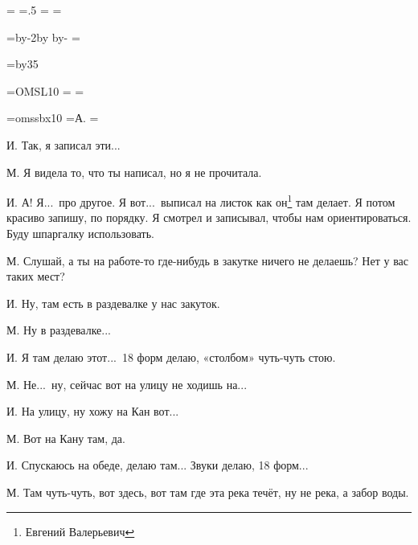\pdfpagewidth=297mm
\pdfpageheight=210mm
\pdfhorigin=1in
\pdfvorigin=0pt

\shhtotal=\pdfpagewidth
\htotal=.5\shhtotal
\vtotal=\pdfpageheight
\shoutline=0pt
\shstaplewidth=0pt
\shcrop=0pt
\shfootline={}
\shthickness=0pt %

\horigin=9mm
\hoffset=-9mm
\hsize=\htotal \advance\hsize by-2\horigin \advance\hsize by\hoffset
\advance\horigin by-\hoffset
\output={\ifodd\pageno\hoffset=0pt\fi \plainoutput}

\vorigin=15mm
\vsize=\topskip \advance\vsize by35\baselineskip

\font\TENSL=OMSL10
\headline={\line{\hrulefill}}
\footline={\line{\hss\tenrm\folio\hss}}

\font\speakerF=omssbx10
\def\I{\item{\speakerF И.}}
\def\M{\item{\speakerF М.}}
=\hbox{\speakerF А.\enskip}
\parindent=


\I
Так, я записал эти...

\M
Я видела то, что ты написал, но я не прочитала.

\I
А! Я...\ про другое. Я вот...\ выписал на листок как он\footnote*{Евгений Валерьевич} там делает.
Я потом красиво запишу, по порядку.
Я смотрел и записывал, чтобы нам ориентироваться.
Буду шпаргалку использовать.

\M
Слушай, а ты на работе-то где-нибудь в закутке ничего не делаешь?
Нет у вас таких мест?

\I
Ну, там есть в раздевалке у нас закуток.

\M
Ну в раздевалке...

\I
Я там делаю этот...\
18 форм делаю, «столбом» чуть-чуть стою.

\M
Не...\ ну, сейчас вот на улицу не ходишь на...

\I
На улицу, ну хожу на Кан вот...

\M
Вот на Кану там, да.

\I
Спускаюсь на обеде, делаю там...
Звуки делаю, 18 форм...

\M
Там чуть-чуть, вот здесь, вот там где эта река течёт, ну не река, а забор воды.


